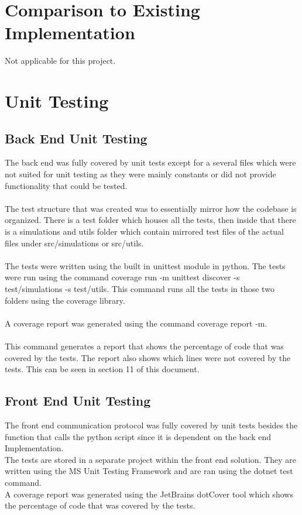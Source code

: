 \documentclass[12pt, titlepage]{article}
\begin{document}
\section{Comparison to Existing Implementation}	

Not applicable for this project.
\section{Unit Testing}

\subsection{Back End Unit Testing}
The back end was fully covered by unit tests except for a several files which were not suited for unit testing as they were mainly constants or did not provide functionality that could be tested. \\
\\
The test structure that was created was to essentially mirror how the codebase is organized. There is a test folder which houses all the tests, then inside that there is a simulations and utils folder which contain mirrored test files of the actual files under src/simulations or src/utils.\\
\\
The tests were written using the built in unittest module in python. The tests were run using the command coverage run -m unittest discover -s test/simulations -s test/utils. This command runs all the tests in those two folders using the coverage library.\\
\\
A coverage report was generated using the command coverage report -m.\\
\\
This command generates a report that shows the percentage of code that was covered by the tests. The report also shows which lines were not covered by the tests.
This can be seen in section 11 of this document.\\

\subsection{Front End Unit Testing}
The front end communication protocol was fully covered by unit tests besides the function that calls the python script since it is dependent on the back end Implementation.
\\
The tests are stored in a separate project within the front end solution. They are written using the MS Unit Testing Framework and are ran using the dotnet test command.
\\
A coverage report was generated using the JetBrains dotCover tool which shows the percentage of code that was covered by the tests.  
\end{document}
